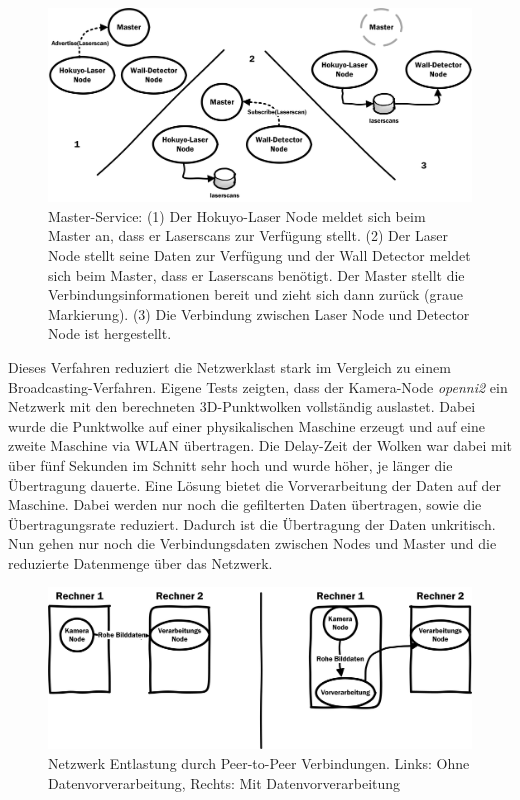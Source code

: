  \begin{figure}[h]
 	\centering
 	\includegraphics[scale=0.8]{fig/masternode}   
 	\caption[Master-Service]{Master-Service: (1) Der Hokuyo-Laser Node meldet sich beim Master an, dass er Laserscans zur Verfügung stellt. (2) Der Laser Node stellt seine Daten zur Verfügung und der Wall Detector meldet sich beim Master, dass er Laserscans benötigt. Der Master stellt die Verbindungsinformationen bereit und zieht sich dann zurück (graue Markierung). (3) Die Verbindung zwischen Laser Node und Detector Node ist hergestellt.}
 	\label{fig:basic-ros-masternode}
 \end{figure}
 
 Dieses Verfahren reduziert die Netzwerklast stark im Vergleich zu einem Broadcasting-Verfahren. Eigene Tests zeigten, dass der Kamera-Node \textit{openni2} ein Netzwerk mit den berechneten 3D-Punktwolken vollständig auslastet. Dabei wurde die Punktwolke auf einer physikalischen Maschine  erzeugt und auf eine zweite Maschine via WLAN übertragen. Die Delay-Zeit der Wolken war dabei mit über fünf Sekunden im Schnitt sehr hoch und wurde höher, je länger die Übertragung dauerte. Eine Lösung bietet die Vorverarbeitung der Daten auf der Maschine. Dabei werden nur noch die gefilterten Daten übertragen, sowie die Übertragungsrate reduziert. Dadurch ist die Übertragung der Daten unkritisch. Nun gehen nur noch die Verbindungsdaten zwischen Nodes und Master und die reduzierte Datenmenge über das Netzwerk.
 
 \begin{figure}[h]
 	\centering
 	\includegraphics[scale=0.8]{fig/masternet}   
 	\caption[Netzwerk Entlastung durch Peer-to-Peer Verbindungen]{Netzwerk Entlastung durch Peer-to-Peer Verbindungen. Links: Ohne Datenvorverarbeitung, Rechts: Mit Datenvorverarbeitung}
 	\label{fig:basic-ros-masternet}
 \end{figure}
 
